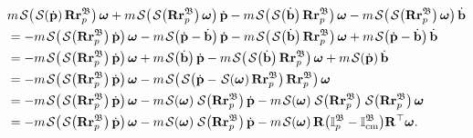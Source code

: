 \begin{align}
    &m\SL[\SL[\dot{\mathbf{p}}]\mathbf{R}\mathbf{r}_p^\mathfrak{B}]\boldsymbol{\omega} + m\SL[\SL[\mathbf{R}\mathbf{r}_p^\mathfrak{B}]\boldsymbol{\omega}]\dot{\mathbf{p}}
    -m\SL[\SL[\dot{\mathbf{b}}]\mathbf{R}\mathbf{r}_p^\mathfrak{B}]\boldsymbol{\omega}  -m\SL[\SL[\mathbf{R}\mathbf{r}_p^\mathfrak{B}]\boldsymbol{\omega}]\dot{\mathbf{b}}\nonumber\\
    &=-m\SL[\SL[\mathbf{R}\mathbf{r}_p^\mathfrak{B}]\dot{\mathbf{p}}]\boldsymbol{\omega}
    -m\SL[\dot{\mathbf{p}} - \dot{\mathbf{b}}]\dot{\mathbf{p}}
    -m\SL[\SL[\dot{\mathbf{b}}]\mathbf{R}\mathbf{r}_p^\mathfrak{B}]\boldsymbol{\omega}
    +m\SL[\dot{\mathbf{p}} - \dot{\mathbf{b}}]\dot{\mathbf{b}}\nonumber\\
    &=-m\SL[\SL[\mathbf{R}\mathbf{r}_p^\mathfrak{B}]\dot{\mathbf{p}}]\boldsymbol{\omega}
    +m\SL[\dot{\mathbf{b}}]\dot{\mathbf{p}}
    -m\SL[\SL[\dot{\mathbf{b}}]\mathbf{R}\mathbf{r}_p^\mathfrak{B}]\boldsymbol{\omega}
    +m\SL[\dot{\mathbf{p}}]\dot{\mathbf{b}}\nonumber\\
    &=-m\SL[\SL[\mathbf{R}\mathbf{r}_p^\mathfrak{B}]\dot{\mathbf{p}}]\boldsymbol{\omega}
    -m\SL[\SL[\dot{\mathbf{p}}-\SL[\boldsymbol{\omega}]\mathbf{R}\mathbf{r}_p^\mathfrak{B}]\mathbf{R}\mathbf{r}_p^\mathfrak{B}]\boldsymbol{\omega}\nonumber\\
    &=-m\SL[\SL[\mathbf{R}\mathbf{r}_p^\mathfrak{B}]\dot{\mathbf{p}}]\boldsymbol{\omega}
    -m\SL[\boldsymbol{\omega}]\SL[\mathbf{R}\mathbf{r}_p^\mathfrak{B}]\dot{\mathbf{p}}
    - m\SL[\boldsymbol{\omega}]\SL[\mathbf{R}\mathbf{r}_p^\mathfrak{B}]\SL[\mathbf{R}\mathbf{r}_p^\mathfrak{B}]\boldsymbol{\omega}\nonumber\\
    &=-m\SL[\SL[\mathbf{R}\mathbf{r}_p^\mathfrak{B}]\dot{\mathbf{p}}]\boldsymbol{\omega}
    -m\SL[\boldsymbol{\omega}]\SL[\mathbf{R}\mathbf{r}_p^\mathfrak{B}]\dot{\mathbf{p}}
    - m\SL[\boldsymbol{\omega}]\mathbf{R}\bigl(\mathbb{I}^\mathfrak{B}_p-\mathbb{I}^\mathfrak{B}_\text{cm}\bigr)\mathbf{R}^\top\boldsymbol{\omega}. \label{eq:partial-torque3}
\end{align}
